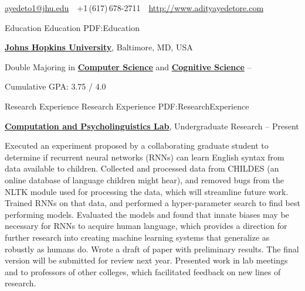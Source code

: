 \documentclass[letterpaper,MMMyyyy,nonstopmode,14pt]{simpleresumecv}
\newcommand{\CVAuthor}{Aditya Yedetore}
\newcommand{\CVWebpage}{http://www.adityayedetore.com}
\begin{document}

\Title{\CVAuthor}

\begin{SubTitle}
\href{mailto:ayedeto1@jhu.edu}
{ayedeto1@jhu.edu}
\,\SubBulletSymbol\,
+1\,(617)\,678-2711
\,\SubBulletSymbol\,
\href{\CVWebpage}
{\url{\CVWebpage}}
\end{SubTitle}

\begin{Body}


\Section
{Education}
{Education}
{PDF:Education}

\Entry
\href{https://www.jhu.edu}
{\textbf{Johns Hopkins University}},
Baltimore, MD, USA

\Gap
\BulletItem
Double Majoring in 
\href{https://www.cs.jhu.edu}
{\textbf{Computer Science}}
and 
\href{https://cogsci.jhu.edu}
{\textbf{Cognitive Science}}
\hfill
{} -- 

\begin{Detail}
	\SubBulletItem
	Cumulative GPA: 3.75 / 4.0
\end{Detail}


\Section
{Research Experience}
{Research Experience}
{PDF:ResearchExperience}

\Entry
\href{https://caplabjhu.org}
{\textbf{Computation and Psycholinguistics Lab}},
Undergraduate Research
\hfill
{} --
Present

\BulletItem Executed an experiment proposed by a collaborating graduate student to determine if recurrent neural networks (RNNs) can learn English syntax from data available to children. 
\BulletItem Collected and processed data from CHILDES (an online database of language children might hear), and removed bugs from the NLTK module used for processing the data, which will streamline future work. 
\BulletItem Trained RNNs on that data, and performed a hyper-parameter search to find best performing models. 
\BulletItem Evaluated the models and found that innate biases may be necessary for RNNs to acquire human language, which provides a direction for further research into creating machine learning systems that generalize as robustly as humans do. 
\BulletItem Wrote a draft of paper with preliminary results. The final version will be submitted for review next year. 
\BulletItem Presented work in lab meetings and to professors of other colleges, which facilitated feedback on new lines of research. 


\end{Body}
\end{document}
